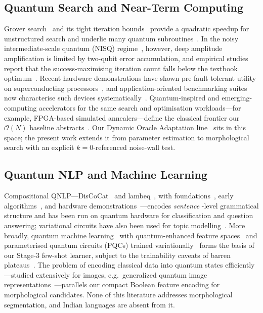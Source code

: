 \documentclass[journal]{IEEEtran}
\newcommand{\bigO}{\mathcal{O}}
\begin{document}
\subsection{Quantum Search and Near-Term Computing}
Grover search~\cite{grover1996} and its tight iteration
bounds~\cite{bbht1998} provide a quadratic speedup for unstructured
search and underlie many quantum subroutines~\cite{nielsen2010}. In the noisy
intermediate-scale quantum
(NISQ) regime~\cite{preskill2018}, however, deep amplitude amplification is
limited by two-qubit error accumulation, and empirical studies report that the
success-maximising iteration count falls below the textbook
optimum~\cite{morales2018,mandviwalla2018}. Recent hardware demonstrations have
shown pre-fault-tolerant utility on superconducting
processors~\cite{kim2023}, and application-oriented benchmarking suites now
characterise such devices systematically~\cite{preston2022,lubinski2023}.
Quantum-inspired and emerging-computing accelerators for the same search and
optimisation workloads---for example, FPGA-based simulated annealers---define the
classical frontier our $\bigO(N)$ baseline abstracts~\cite{waidyasooriya2021}.
Our Dynamic Oracle Adaptation line~\cite{doa2026} sits in this space; the present
work extends it from parameter estimation to morphological search with an
explicit $k{=}0$-referenced noise-wall test.

\subsection{Quantum NLP and Machine Learning}
Compositional QNLP---DisCoCat~\cite{coecke2020qa} and lambeq~\cite{lambeq2021},
with foundations~\cite{coecke2020found}, early algorithms~\cite{zeng2016}, and
hardware demonstrations~\cite{lorenz2023,meichan2021}---encodes \emph{sentence}%
-level grammatical structure and has been run on quantum hardware for
classification and question answering; variational circuits have also been used
for topic modelling~\cite{qiao2024}. More broadly, quantum machine
learning~\cite{biamonte2017} with quantum-enhanced feature
spaces~\cite{havlicek2019,schuld2019} and parameterised quantum circuits (PQCs)
trained variationally~\cite{mitarai2018,benedetti2019,cerezo2021}
forms the basis of our Stage-3 few-shot learner, subject to the trainability
caveats of barren plateaus~\cite{mcclean2018}. The problem of encoding classical
data into quantum states efficiently---studied extensively for images, e.g.\
generalized quantum image representations~\cite{xing2024ngqr}---parallels our
compact Boolean feature encoding for morphological candidates. None of this
literature addresses morphological segmentation, and Indian languages are absent
from it.
\end{document}
